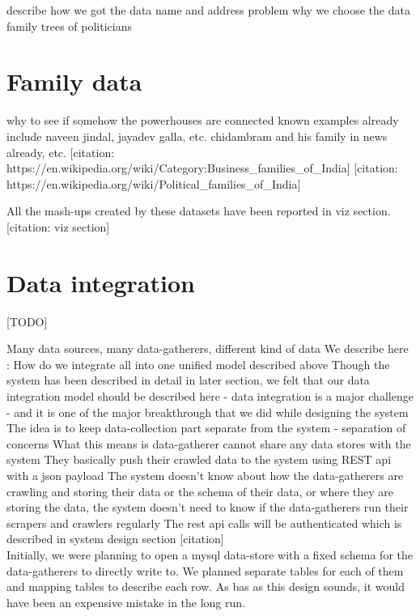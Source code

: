 describe how we got the data
name and address problem
why we choose the data family trees of politicians




\section{Family data}

why to see if somehow the powerhouses are connected 
known examples already include naveen jindal, jayadev galla, etc.
chidambram and his family in news already, etc.
[citation: https://en.wikipedia.org/wiki/Category:Business\_families\_of\_India]
[citation: https://en.wikipedia.org/wiki/Political\_families\_of\_India]

All the mash-ups created by these datasets have been reported in viz section. [citation: viz section]

\section{Data integration}

[TODO]

Many data sources, many data-gatherers, different kind of data
We describe here : How do we integrate all into one unified model described above
Though the system has been described in detail in later section, we felt that our data integration model should be described here - data integration is a major challenge - and it is one of the major breakthrough that we did while designing the system \\

The idea is to keep data-collection part separate from the system - separation of concerns
What this means is data-gatherer cannot share any data stores with the system
They basically push their crawled data to the system using REST api with a json payload
The system doesn't know about how the data-gatherers are crawling and storing their data or the schema of their data, or where they are storing the data,  the system doesn't need to know if the data-gatherers run their scrapers and crawlers regularly
The rest api calls will be authenticated which is described in system design section [citation] \\

Initially, we were planning to open a mysql data-store with a fixed schema for the data-gatherers to directly write to. We planned separate tables for each of them and mapping tables to describe each row. As bas as this design sounds, it would have been an expensive mistake in the long run. \\

